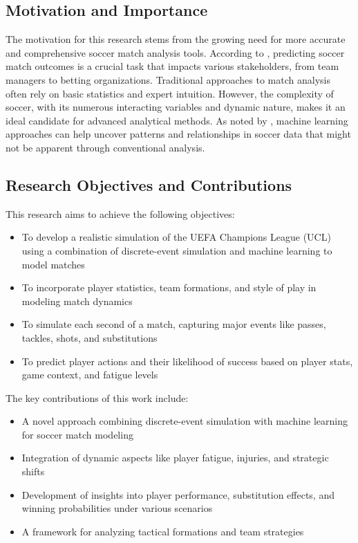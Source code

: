 \documentclass[10pt,journal,compsoc]{IEEEtran}
\begin{document}
\subsection{Motivation and Importance}
The motivation for this research stems from the growing need for more accurate and comprehensive soccer match analysis tools. According to \cite{wong2025predictive}, predicting soccer match outcomes is a crucial task that impacts various stakeholders, from team managers to betting organizations. Traditional approaches to match analysis often rely on basic statistics and expert intuition. However, the complexity of soccer, with its numerous interacting variables and dynamic nature, makes it an ideal candidate for advanced analytical methods. As noted by \cite{rico2023machine}, machine learning approaches can help uncover patterns and relationships in soccer data that might not be apparent through conventional analysis.

\subsection{Research Objectives and Contributions}
This research aims to achieve the following objectives:
\begin{itemize}
    \item To develop a realistic simulation of the UEFA Champions League (UCL) using a combination of discrete-event simulation and machine learning to model matches
    \item To incorporate player statistics, team formations, and style of play in modeling match dynamics
    \item To simulate each second of a match, capturing major events like passes, tackles, shots, and substitutions
    \item To predict player actions and their likelihood of success based on player stats, game context, and fatigue levels
\end{itemize}

The key contributions of this work include:
\begin{itemize}
    \item A novel approach combining discrete-event simulation with machine learning for soccer match modeling
    \item Integration of dynamic aspects like player fatigue, injuries, and strategic shifts
    \item Development of insights into player performance, substitution effects, and winning probabilities under various scenarios
    \item A framework for analyzing tactical formations and team strategies
\end{itemize}
\end{document}
